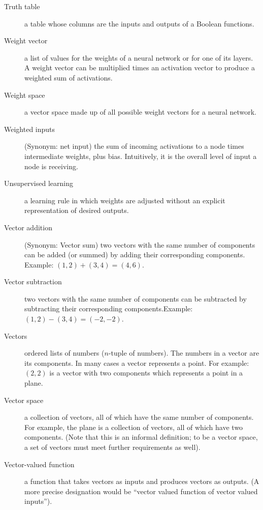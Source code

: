 \begin{description}
\item[Truth table] a table whose columns are the inputs and outputs of a Boolean functions.

\item[Weight vector] a list of values for the weights of a neural network or for one of its layers. A weight vector can be multiplied times an activation vector to produce a weighted sum of activations.

\item[Weight space] a vector space made up of all possible weight vectors for a neural network.

\item[Weighted inputs] (Synonym: net input) the sum of incoming activations to a node times intermediate weights, plus bias. Intuitively, it is the overall level of input a node is receiving.

\item[Unsupervised learning] a learning rule in which weights are adjusted without an explicit representation of desired outputs.

\item[Vector addition] (Synonym: Vector sum) two vectors with the same number of components can be added (or summed) by adding their corresponding components. Example: $(1,2) + (3,4) = (4,6)$.

\item[Vector subtraction] two vectors with the same number of components can be subtracted by subtracting their corresponding components.Example: $(1,2) - (3,4) = (-2,-2)$.

\item[Vectors] ordered lists of numbers ($n$-tuple of numbers). The numbers in a vector are its components. In many cases a vector represents a point. For example: $(2,2)$ is a vector with two components which represents a point in a plane.

\item[Vector space] a collection of vectors, all of which have the same number of components. For example, the plane is a collection of vectors, all of which have two components. (Note that this is an  informal definition; to be a vector space, a set of vectors must meet further requirements as well).

\item[Vector-valued function] a function that takes vectors as inputs and produces vectors as outputs. (A more precise designation would be ``vector valued function of vector valued inputs''). 


\end{description}
